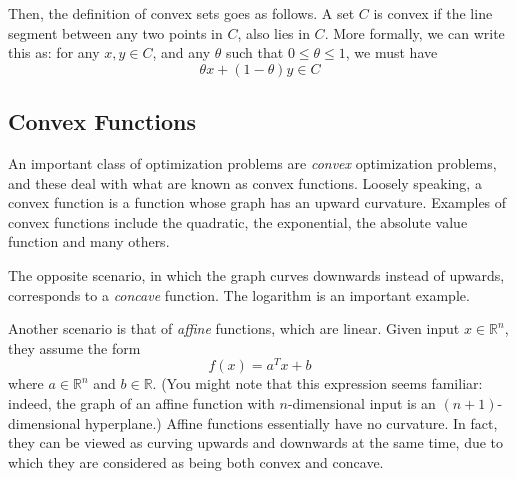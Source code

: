 \documentclass[a4paper]{article}
\theoremstyle{definition}
\begin{document}
Then, the definition of convex sets goes as follows.
A set $C$ is convex if the line segment between any two points in $C$, also lies in $C$.
More formally, we can write this as: for any $x, y \in C$, and any $\theta$ such that $0 \leq \theta \leq 1$, we must have
\begin{equation*}
	\theta x + (1 - \theta) y \in C
\end{equation*}



\subsection{Convex Functions}

An important class of optimization problems are \textit{convex} optimization problems, and these deal with what are known as convex functions.
Loosely speaking, a convex function is a function whose graph has an upward curvature.
Examples of convex functions include the quadratic, the exponential, the absolute value function and many others.

The opposite scenario, in which the graph curves downwards instead of upwards, corresponds to a \textit{concave} function.
The logarithm is an important example.

Another scenario is that of \textit{affine} functions, which are linear.
Given input $x \in \mathbb{R}^n$, they assume the form
\begin{equation*}
	f(x) = a^T x + b
\end{equation*}
where $a \in \mathbb{R}^n$ and $b \in \mathbb{R}$.
(You might note that this expression seems familiar: indeed, the graph of an affine function with $n$-dimensional input is an $(n{+}1)$-dimensional hyperplane.)
Affine functions essentially have no curvature.
In fact, they can be viewed as curving upwards and downwards at the same time, due to which they are considered as being both convex and concave.
\end{document}
